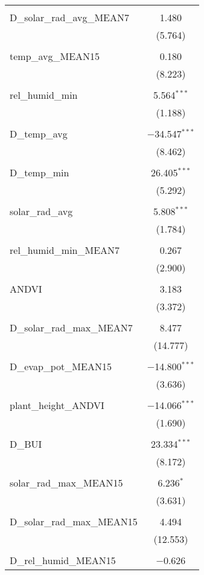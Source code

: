 \begin{table}[!htbp]
\begin{tabular}{@{\extracolsep{5pt}}lc}
  & \\ 
 D\_solar\_rad\_avg\_MEAN7 & 1.480 \\ 
  & (5.764) \\ 
  & \\ 
 temp\_avg\_MEAN15 & 0.180 \\ 
  & (8.223) \\ 
  & \\ 
 rel\_humid\_min & 5.564$^{***}$ \\ 
  & (1.188) \\ 
  & \\ 
 D\_temp\_avg & $-$34.547$^{***}$ \\ 
  & (8.462) \\ 
  & \\ 
 D\_temp\_min & 26.405$^{***}$ \\ 
  & (5.292) \\ 
  & \\ 
 solar\_rad\_avg & 5.808$^{***}$ \\ 
  & (1.784) \\ 
  & \\ 
 rel\_humid\_min\_MEAN7 & 0.267 \\ 
  & (2.900) \\ 
  & \\ 
 ANDVI & 3.183 \\ 
  & (3.372) \\ 
  & \\ 
 D\_solar\_rad\_max\_MEAN7 & 8.477 \\ 
  & (14.777) \\ 
  & \\ 
 D\_evap\_pot\_MEAN15 & $-$14.800$^{***}$ \\ 
  & (3.636) \\ 
  & \\ 
 plant\_height\_ANDVI & $-$14.066$^{***}$ \\ 
  & (1.690) \\ 
  & \\ 
 D\_BUI & 23.334$^{***}$ \\ 
  & (8.172) \\ 
  & \\ 
 solar\_rad\_max\_MEAN15 & 6.236$^{*}$ \\ 
  & (3.631) \\ 
  & \\ 
 D\_solar\_rad\_max\_MEAN15 & 4.494 \\ 
  & (12.553) \\ 
  & \\ 
 D\_rel\_humid\_MEAN15 & $-$0.626 \\ 

\end{tabular}
\end{table}
